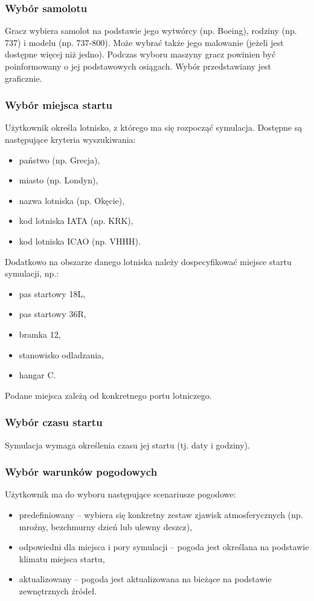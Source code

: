 \documentclass{mwrep}
\begin{document}
\subsubsection{Wybór samolotu}
Gracz wybiera samolot na podstawie jego wytwórcy (np. Boeing), rodziny (np. 737) i modelu (np. 737-800). Może wybrać także jego malowanie (jeżeli jest dostępne więcej niż jedno). Podczas wyboru maszyny gracz powinien być poinformowany o jej podstawowych osiągach. Wybór przedstawiany jest graficznie.

\subsubsection{Wybór miejsca startu}
Użytkownik określa lotnisko, z którego ma się rozpocząć symulacja. Dostępne są następujące kryteria wyszukiwania:
\begin{itemize}
\item państwo (np. Grecja),
\item miasto (np. Londyn),
\item nazwa lotniska (np. Okęcie),
\item kod lotniska IATA (np. KRK),
\item kod lotniska ICAO (np. VHHH).
\end{itemize}
Dodatkowo na obszarze danego lotniska należy dospecyfikować miejsce startu symulacji, np.:
\begin{itemize}
\item pas startowy 18L,
\item pas startowy 36R,
\item bramka 12,
\item stanowisko odladzania,
\item hangar C.
\end{itemize}
Podane miejsca zależą od konkretnego portu lotniczego.

\subsubsection{Wybór czasu startu}
Symulacja wymaga określenia czasu jej startu (tj. daty i godziny).

\subsubsection{Wybór warunków pogodowych}
Użytkownik ma do wyboru następujące scenariusze pogodowe:
\begin{itemize}
\item predefiniowany -- wybiera się konkretny zestaw zjawisk atmosferycznych (np. mroźny, bezchmurny dzień lub ulewny deszcz),
\item odpowiedni dla miejsca i pory symulacji -- pogoda jest określana na podstawie klimatu miejsca startu,
\item aktualizowany -- pogoda jest aktualizowana na bieżące na podstawie zewnętrznych źródeł.
\end{itemize}
\end{document}
